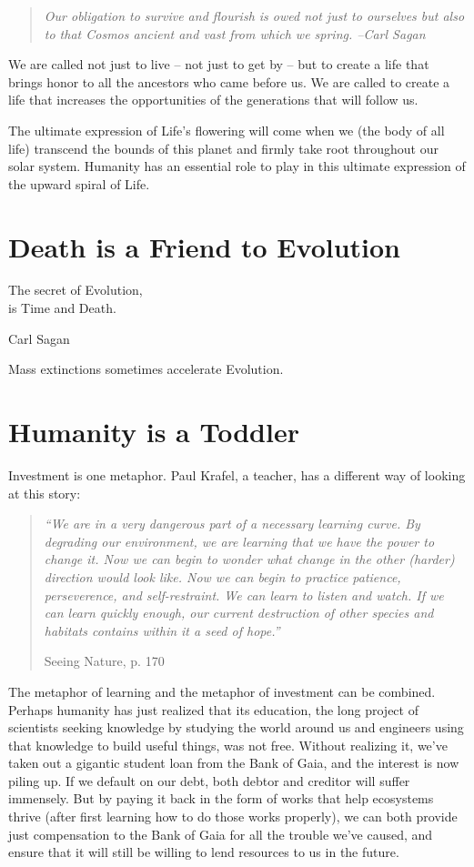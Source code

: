 \documentclass[ebook,12pt,openany,twoside]{memoir}
\newcommand{\tab}{\hspace*{2em}}
\newcommand{\imagefacingchapter}[1]{
  \cleartoverso
  \clearpage \null
  \thispagestyle{cleared}
  \AddToShipoutPictureBG*{%
    \AtStockLowerLeft{%
      \texttt{[image: \#1]}
    }
  }
  \clearpage
}
\begin{document}
\begin{quote}
\em
Our obligation to survive and flourish is owed not just to ourselves but also
to that Cosmos ancient and vast from which we spring. --Carl Sagan
\end{quote}

We are called not just to live -- not just to get by -- but to create a life
that brings honor to all the ancestors who came before us. We are called to
create a life that increases the opportunities of the generations that will
follow us.

The ultimate expression of Life's flowering will come when we (the body of all
life) transcend the bounds of this planet and firmly take root throughout our
solar system. Humanity has an essential role to play in this ultimate
expression of the upward spiral of Life.

\chapter{Death is a Friend to Evolution}

\setlength\epigraphwidth{1.8in}
\epigraph{
  The secret of Evolution,\\
  is Time and Death.
}{Carl Sagan}

\noindent Mass extinctions sometimes accelerate Evolution.

\imagefacingchapter{images/KnockingBlocks}
\chapter{Humanity is a Toddler}

\noindent Investment is one metaphor. Paul Krafel, a teacher, has a different way of
looking at this story:

\begin{quote}
	\em
	``We are in a very dangerous part of a necessary learning curve. By
degrading our environment, we are learning that we have the power to change it.
Now we can begin to wonder what change in the other (harder) direction would
look like. Now we can begin to practice patience, perseverence, and
self-restraint. We can learn to listen and watch. If we can learn quickly
enough, our current destruction of other species and habitats contains within
it a seed of hope.''

\tab \tab Seeing Nature, p. 170
\end{quote}

The metaphor of learning and the metaphor of investment can be combined.
Perhaps humanity has just realized that its education, the long project of
scientists seeking knowledge by studying the world around us and engineers
using that knowledge to build useful things, was not free. Without realizing
it, we've taken out a gigantic student loan from the Bank of Gaia, and the
interest is now piling up. If we default on our debt, both debtor and creditor
will suffer immensely. But by paying it back in the form of works that help
ecosystems thrive (after first learning how to do those works properly), we can
both provide just compensation to the Bank of Gaia for all the trouble we've
caused, and ensure that it will still be willing to lend resources to us in the
future.
\end{document}
